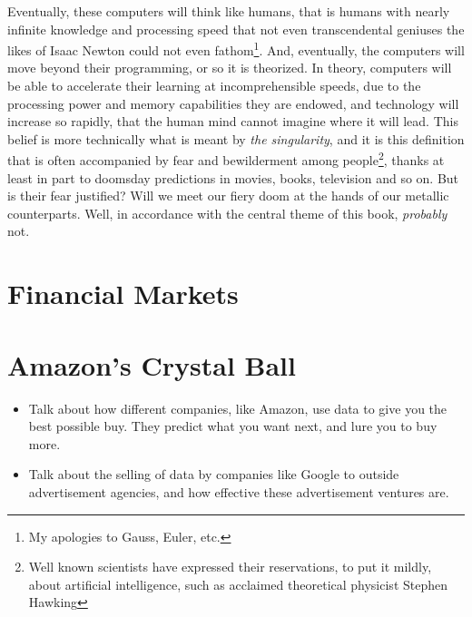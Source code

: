 \documentclass[12pt,twoside]{book}
\begin{document}
	Eventually, these computers will think like humans, that is humans with nearly infinite knowledge and processing speed that not even transcendental geniuses the likes of Isaac Newton could not even fathom\footnote{My apologies to Gauss, Euler, etc.}. And, eventually, the computers will move beyond their programming, or so it is theorized. In theory, computers will be able to accelerate their learning at incomprehensible speeds, due to the processing power and memory capabilities they are endowed, and technology will increase so rapidly, that the human mind cannot imagine where it will lead.  This belief is more technically what is meant by \emph{the singularity}, and it is this definition that is often accompanied by fear and bewilderment among people\footnote{Well known scientists have expressed their reservations, to put it mildly, about artificial intelligence, such as acclaimed theoretical physicist Stephen Hawking}, thanks at least in part to doomsday predictions in movies, books, television and so on. But is their fear justified?  Will we meet our fiery doom at the hands of our metallic counterparts.  Well, in accordance with the central theme of this book, \emph{probably} not.  
	
	
	\chapter{Financial Markets}
	
	\chapter{Amazon's Crystal Ball}
	\begin{itemize}
		\item Talk about how different companies, like Amazon, use data to give you the best possible buy.  They predict what you want next, and lure you to buy more.
		\item Talk about the selling of data by companies like Google to outside advertisement agencies, and how effective these advertisement ventures are.
	\end{itemize}
\end{document}
